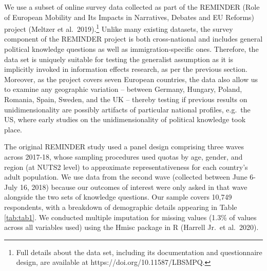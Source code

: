 \documentclass[12pt,halfline,a4paper,]{ouparticle}
\begin{document}
We use a subset of online survey data collected as part of the REMINDER
(Role of European Mobility and Its Impacts in Narratives, Debates and EU
Reforms) project (Meltzer et al.~2019).\footnote{Full details about the
  data set, including its documentation and questionnaire design, are
  available at https://doi.org/10.11587/LBSMPQ.} Unlike many existing
datasets, the survey component of the REMINDER project is both
cross-national and includes general political knowledge questions as
well as immigration-specific ones. Therefore, the data set is uniquely
suitable for testing the generalist assumption as it is implicitly
invoked in information effects research, as per the previous section.
Moreover, as the project covers seven European countries, the data also
allow us to examine any geographic variation -- between Germany,
Hungary, Poland, Romania, Spain, Sweden, and the UK -- thereby testing
if previous results on unidimensionality are possibly artifacts of
particular national profiles, e.g.~the US, where early studies on the
unidimensionality of political knowledge took place.

The original REMINDER study used a panel design comprising three waves
across 2017-18, whose sampling procedures used quotas by age, gender,
and region (at NUTS2 level) to approximate representativeness for each
country's adult population. We use data from the second wave (collected
between June 6-July 16, 2018) because our outcomes of interest were only
asked in that wave alongside the two sets of knowledge questions. Our
sample covers 10,749 respondents, with a breakdown of demographic
details appearing in Table \ref{tab:tab1}. We conducted multiple
imputation for missing values (1.3\% of values across all variables
used) using the Hmisc package in R (Harrell Jr.~et al.~2020).
\end{document}
